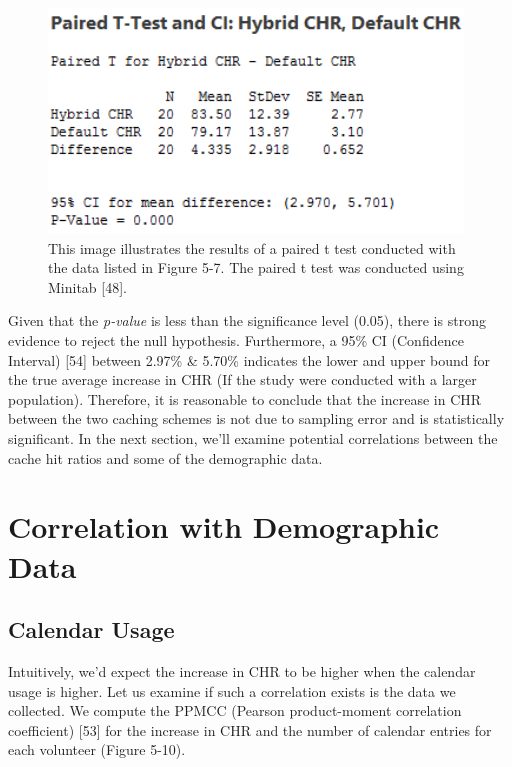 \documentclass[12pt]{uthesis-v12}  %
\begin{document}
			\begin{figure}[h]
				\centering
				\includegraphics[width = 110mm]{images/pairedTest.png}
				\caption[Paired T Test Resuts]{ This image illustrates the results of a paired t test conducted with the data listed in Figure 5-7. The paired t test was conducted using Minitab [48].}
			\end{figure}			
		
			Given that the {\em p-value} is less than the significance level (0.05), there is strong evidence to reject the null hypothesis. Furthermore, a 95\% CI (Confidence Interval) [54] between 2.97\% \& 5.70\% indicates the lower and upper bound for the true average increase in CHR (If the study were conducted with a larger population). Therefore, it is reasonable to conclude that the increase in CHR between the two caching schemes is not due to sampling error and is statistically significant. In the next section, we'll examine potential correlations between the cache hit ratios and some of the demographic data.
			
		\section{Correlation with Demographic Data}
			
			\subsection{Calendar Usage}
				Intuitively, we'd expect the increase in CHR to be higher when the calendar usage is higher. Let us examine if such a correlation exists is the data we collected. We compute the PPMCC (Pearson product-moment correlation coefficient) [53] for the increase in CHR and the number of calendar entries for each volunteer (Figure 5-10). 
				
\end{document}

